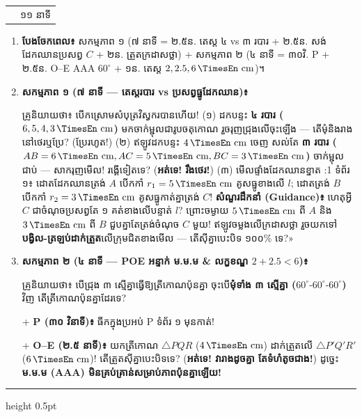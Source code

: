 \documentclass[a4paper,12pt]{article}
\makeatletter
\newcommand{\en}[1]{{\TimesEn #1}}
\newcommand{\enbf}[1]{{\TimesEn\textbf{#1}}}
\newcommand{\unit}[1]{\,\text{\en{#1}}}
\newcommand{\tri}[1]{\ensuremath{\triangle #1}}
\newenvironment{phasebox}[3]{%
  \needspace{2.2cm}%
  \begin{tcolorbox}[
    enhanced, sharp corners, colback=headgray, colframe=black,
    boxrule=1.0pt, top=3.5pt, bottom=3.5pt, left=9pt, right=9pt,
    before skip=6pt, after skip=3pt
  ]%
    \linespread{1.0}\selectfont\renewcommand{\arraystretch}{1.0}%
    \begin{tabular*}{\linewidth}{@{}>{\raggedright\arraybackslash}p{13.10cm}@{\extracolsep{\fill}}r@{}}
      {\muol\fontsize{11pt}{14.5pt}\selectfont #1} & {\fontsize{10.5pt}{13.5pt}\selectfont\en{#2 |} #3}%
    \end{tabular*}%
  \end{tcolorbox}%
  \begingroup\fontsize{11.5pt}{14.92pt}\selectfont
}{%
  \par\endgroup\vspace{3pt}\hrule height 0.5pt\vspace{4pt}%
}
\makeatother
\begin{document}
\begin{phasebox}{ជំហានទី ៣ \enbf{(}ក\enbf{) --- E2 Explore}៖ ស៊ុម ៤ \enbf{vs} ៣ របារ \enbf{\&} អន្ទាក់ \enbf{POE AAA}}{11--22 min}{១១ នាទី}
  \begin{enumerate}[leftmargin=0.45cm, topsep=1.5pt, itemsep=2.2pt, parsep=0pt]
    \item \textbf{បែងចែកពេល៖} សកម្មភាព ១ (៧ នាទី = ២.៥ន. តេស្ត ៤ vs ៣ របារ + ២.៥ន. សង់ដែកឈានប្រសព្វ $C$ + ២ន. ត្រួតក្រដាសថ្លា) + សកម្មភាព ២ (៤ នាទី = ៣០វិ. \en{P} + ២.៥ន. \en{O--E AAA} $60^\circ$ + ១ន. តេស្ត $2, 2.5, 6\unit{cm}$)។
    \item \textbf{សកម្មភាព ១ (៧ នាទី — តេស្តរបារ \en{vs} ប្រសព្វធ្នូដែកឈាន)៖}
      \begin{scriptbox}
        {\muol\fontsize{10.8pt}{14.5pt}\selectfont \enbf{«}គ្រូនិយាយថា៖} បើកស្រោមសំបុត្រវិស្វករបានហើយ! (១) ដកបន្ទះ \textbf{៤ របារ ($6, 5, 4, 3\unit{cm}$)} មកចាក់ម្ជុលជារូបចតុកោណ រួចរុញជ្រុងលើចុះឡើង — តើមុំនិងរាងនៅថេរឬប្រែ? (ប្រែរហូត!) (២) ឥឡូវដកបន្ទះ $4\unit{cm}$ ចេញ សល់តែ \textbf{៣ របារ ($AB=6\unit{cm}, AC=5\unit{cm}, BC=3\unit{cm}$)} ចាក់ម្ជុលជាប់ — សាករុញមើល! រង្គើទៀតទេ? (\textbf{អត់ទេ! រឹងថេរ!}) (៣) មើលផ្ទាំងដែកឈានខ្នាត \en{1:1} ទំព័រ ១៖ ដោតដែកឈានត្រង់ $A$ បើកកាំ $r_1 = 5\unit{cm}$ គូសធ្នូខាងលើ $l$; ដោតត្រង់ $B$ បើកកាំ $r_2 = 3\unit{cm}$ គូសធ្នូកាត់គ្នាត្រង់ $C$! \textbf{សំណួរដឹកនាំ (\en{Guidance})៖} ហេតុអ្វី $C$ ជាចំណុចប្រសព្វតែ ១ គត់ខាងលើបន្ទាត់ $l$? ព្រោះចម្ងាយ $5\unit{cm}$ ពី $A$ និង $3\unit{cm}$ ពី $B$ ជួបគ្នាតែត្រង់ចំណុច $C$ មួយ! ឥឡូវចម្លងលើក្រដាសថ្លា រួចយកទៅ\textbf{បង្វិល-ត្រឡប់ដាក់ត្រួត}លើក្រុមជិតខាងមើល — តើស៊ីគ្នាបេះបិទ ១០០\% ទេ?»
      \end{scriptbox}
    \item \textbf{សកម្មភាព ២ (៤ នាទី — \en{POE} អន្ទាក់ ម.ម.ម \en{\&} លក្ខខណ្ឌ $2+2.5<6$)៖}
      \begin{scriptbox}
        {\muol\fontsize{10.8pt}{14.5pt}\selectfont \enbf{«}គ្រូនិយាយថា៖} បើជ្រុង ៣ ស្មើគ្នាធ្វើឱ្យត្រីកោណប៉ុនគ្នា ចុះបើ\textbf{មុំទាំង ៣ ស្មើគ្នា ($60^\circ\text{-}60^\circ\text{-}60^\circ$)} វិញ តើត្រីកោណប៉ុនគ្នាដែរទេ?\par\vspace{2pt}
        + \textbf{P (៣០ វិនាទី)៖} ធីកក្នុងប្រអប់ \en{P} ទំព័រ ១ មុនកាត់!\par\vspace{1.5pt}
        + \textbf{O--E (២.៥ នាទី)៖} យកត្រីកោណ $\tri{PQR}$ ($4\unit{cm}$) ដាក់ត្រួតលើ $\tri{P'Q'R'}$ ($6\unit{cm}$)! តើត្រួតស៊ីគ្នាបេះបិទទេ? (\textbf{អត់ទេ! វារាងដូចគ្នា តែទំហំតូចជាង!}) ដូច្នេះ \textbf{ម.ម.ម (\en{AAA}) មិនគ្រប់គ្រាន់សម្រាប់ភាពប៉ុនគ្នាឡើយ!}\par\vspace{1.5pt}

\end{scriptbox}
\end{enumerate}
\end{phasebox}
\end{document}
